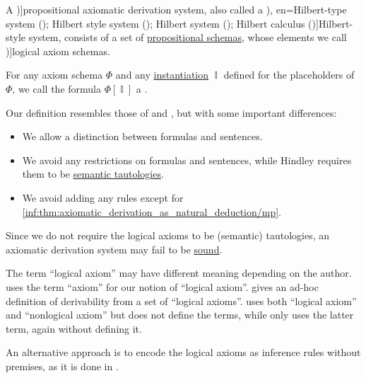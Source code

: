 \begin{definition}\label{def:axiomatic_derivation_system}\mimprovised
  A \term[en=axiomatic system (\cite[6D1]{Hindley1997BasicSTT})]{propositional axiomatic derivation system}, also called a \term[ru=исчисление высказываний гильбертовского типа (\cite[35]{Герасимов2011Вычислимость}), en=Hilbert-type system (\cite[80]{Smullyan1995FOL}); Hilbert style system (\cite[6D1]{Hindley1997BasicSTT}); Hilbert system (\cite[33]{TroelstraSchwichtenberg2000BasicProofTheory}); Hilbert calculus (\cite[103]{Mimram2020ProgramEqualsProof})]{Hilbert-style system}, consists of a set of \hyperref[def:propositional_formula_schema]{propositional schemas}, whose elements we call \term[en=axiom schema (\cite[80]{Smullyan1995FOL})]{logical axiom schemas}.

  For any axiom schema \( \Phi \) and any \hyperref[def:propositional_schema_instantiation]{instantiation} \( \BbbI \) defined for the placeholders of \( \Phi \), we call the formula \( \Phi[\BbbI] \) a .
\end{definition}
\begin{comments}
  \item Our definition resembles those of  and , but with some important differences:
  \begin{itemize}
    \item We allow a distinction between formulas and sentences.
    \item We avoid any restrictions on formulas and sentences, while Hindley requires them to be \hyperref[def:propositional_tautology]{semantic tautologies}.
    \item We avoid adding any rules except for \ref{inf:thm:axiomatic_derivation_as_natural_deduction/mp}.
  \end{itemize}

  \item Since we do not require the logical axioms to be (semantic) tautologies, an axiomatic derivation system may fail to be \hyperref[def:abstract_logic/soundness]{sound}.

  \item The term \enquote{logical axiom} may have different meaning depending on the author.  uses the term \enquote{axiom} for our notion of \enquote{logical axiom}.  gives an ad-hoc definition of derivability from a set of \enquote{logical axioms}.  uses both \enquote{logical axiom} and \enquote{nonlogical axiom} but does not define the terms, while  only uses the latter term, again without defining it.

  \item An alternative approach is to encode the logical axioms as inference rules without premises, as it is done in \cite[103]{Mimram2020ProgramEqualsProof}.
\end{comments}

